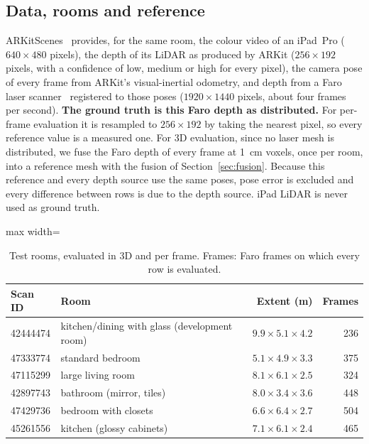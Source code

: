 \subsection{Data, rooms and reference}\label{sec:data}
ARKitScenes~\cite{arkitscenes} provides, for the same room, the colour video of an iPad~Pro ($640\times480$ pixels),
the depth of its LiDAR as produced by ARKit ($256\times192$ pixels, with a confidence of low, medium or high for every
pixel), the camera pose of every frame from ARKit's visual-inertial odometry, and depth from a Faro laser
scanner~\cite{faro} registered to those poses ($1920\times1440$ pixels, about four frames per second).
\textbf{The ground truth is this Faro depth as distributed.} For per-frame evaluation it is resampled to
$256\times192$ by taking the nearest pixel, so every reference value is a measured one. For 3D evaluation, since no
laser mesh is distributed, we fuse the Faro depth of every frame at \SI{1}{cm} voxels, once per room, into a
reference mesh with the fusion of Section~\ref{sec:fusion}. Because this reference and every depth source use the same
poses, pose error is excluded and every difference between rows is due to the depth source. iPad LiDAR is never used
as ground truth.

\begin{table}[t]
\centering\small
\caption{Test rooms, evaluated in 3D and per frame. Frames: Faro frames on which every row is evaluated.}
\label{tab:scenes}
\begin{adjustbox}{max width=\columnwidth}
\begin{tabular}{@{}llrr@{}}
\toprule
Scan ID & Room & Extent (m) & Frames \\
\midrule
42444474 & kitchen/dining with glass (development room) & $9.9\times5.1\times4.2$ & 236 \\
47333774 & standard bedroom & $5.1\times4.9\times3.3$ & 375 \\
47115299 & large living room & $8.1\times6.1\times2.5$ & 324 \\
42897743 & bathroom (mirror, tiles) & $8.0\times3.4\times3.6$ & 448 \\
47429736 & bedroom with closets & $6.6\times6.4\times2.7$ & 504 \\
45261556 & kitchen (glossy cabinets) & $7.1\times6.1\times2.4$ & 465 \\
\bottomrule
\end{tabular}
\end{adjustbox}
\end{table}

